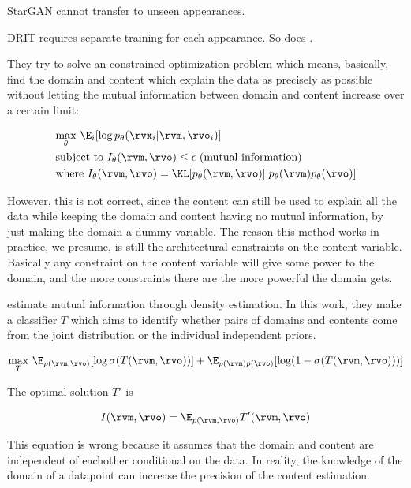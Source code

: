 \citet{choi2018stargan} \citet{choi2020stargan} StarGAN cannot transfer to unseen appearances.

DRIT \citet{lee2018diverse} \citet{lee2020drit++} requires separate training for each appearance. So does \citet{huang2018multimodal}.

They try to solve an constrained optimization problem which means, basically, find the domain and content which explain the data as precisely as possible without letting the mutual information between domain and content increase over a certain limit:

\begin{align}
    & \underset{\theta}{\max} ~ \E_{i} [ \log p_\theta (\rvx_i | \rvm, \rvo_i) ] \\
    & \mathrm{subject ~ to} ~ I_\theta (\rvm, \rvo) \leq \epsilon ~ \mathrm{(mutual ~ information)} \\
    & \mathrm{where} ~ I_\theta (\rvm, \rvo) = \KL[p_\theta(\rvm, \rvo) || p_\theta(\rvm) p_\theta(\rvo)]
\end{align}

However, this is not correct, since the content can still be used to explain all the data while keeping the domain and content having no mutual information, by just making the domain a dummy variable. The reason this method works in practice, we presume, is still the architectural constraints on the content variable. Basically any constraint on the content variable will give some power to the domain, and the more constraints there are the more powerful the domain gets.

\citet{pmlr-v70-mescheder17a} \citet{pmlr-v80-belghazi18a} estimate mutual information through density estimation. In this work, they make a classifier $T$ which aims to identify whether pairs of domains and contents come from the joint distribution or the individual independent priors.

\begin{equation}
    \underset{T}{\max} ~ \E_{p(\rvm, \rvo)} [\log \sigma(T(\rvm, \rvo))] + \E_{p(\rvm)p(\rvo)} [\log (1 - \sigma(T(\rvm, \rvo)))]
\end{equation}

The optimal solution $T'$ is 

\begin{equation}
    I(\rvm, \rvo) = \E_{p(\rvm, \rvo)} T' (\rvm, \rvo)
\end{equation}


This equation is wrong because it assumes that the domain and content are independent of eachother conditional on the data. In reality, the knowledge of the domain of a datapoint can increase the precision of the content estimation.

